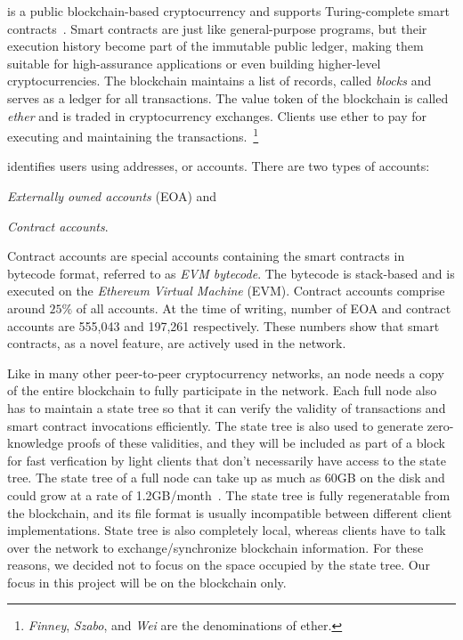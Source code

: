 
\eth{} is a public blockchain-based cryptocurrency and supports Turing-complete smart contracts~\cite{ethereum}.
Smart contracts are just like general-purpose programs, but their execution history become part of the immutable public
ledger, making them suitable for high-assurance applications or even building higher-level cryptocurrencies.
The \eth{} blockchain maintains a list of records, called \emph{blocks} and serves as a ledger for all transactions.
The value token of the blockchain is called \emph{ether} and 
is traded in cryptocurrency exchanges.
Clients use ether to pay for executing and maintaining the transactions.~\footnote{
\emph{Finney}, \emph{Szabo}, and \emph{Wei} are the denominations of ether.}

\eth{} identifies users using addresses, or accounts. There are two types of \eth{} accounts:
\renewcommand\labelenumi{(\theenumi)}
\begin{enumerate*}
	\item \emph{Externally owned accounts} (EOA) and
	\item \emph{Contract accounts}.
\end{enumerate*}
Contract accounts are special accounts containing the smart contracts in bytecode format, referred to as \emph{EVM bytecode}.
The bytecode is stack-based and is executed on the \emph{Ethereum Virtual Machine} (EVM).
Contract accounts comprise around $25\%$ of all \eth{} accounts.
At the time of writing, number of EOA and contract accounts are 555,043 and 197,261 respectively.
These numbers show that smart contracts, as a novel feature, are actively used in the \eth{} network.


Like in many other peer-to-peer cryptocurrency networks, an \eth{} node needs a copy of the entire blockchain to fully participate in the network.
Each full \eth{} node also has to maintain a state tree so that it can verify
the validity of transactions and smart contract invocations efficiently.
The state tree is also used to generate zero-knowledge proofs of these validities, and they will be included as part of a block for
fast verfication by light clients that don't necessarily have access to the state tree.
The state tree of a full node can take up as much as 60GB on the disk and could grow at a rate of 1.2GB/month~\cite{ethdiskspace}.
The state tree is fully regeneratable from the blockchain, and its file format is usually incompatible between different client implementations.
State tree is also completely local, whereas clients have to talk over the network to exchange/synchronize blockchain information.
For these reasons, we decided not to focus on the space occupied by the state tree.
Our focus in this project will be on the blockchain only.

